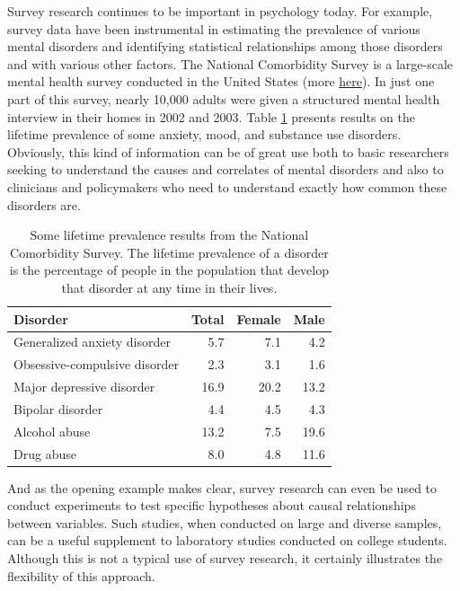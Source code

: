 \documentclass[
]{krantz}
\begin{document}
Survey research continues to be important in psychology today. For example, survey data have been instrumental in estimating the prevalence of various mental disorders and identifying statistical relationships among those disorders and with various other factors. The National Comorbidity Survey is a large-scale mental health survey conducted in the United States (more \href{https://www.hcp.med.harvard.edu/ncs/}{here}). In just one part of this survey, nearly 10,000 adults were given a structured mental health interview in their homes in 2002 and 2003. Table \ref{tab:comorbidity} presents results on the lifetime prevalence of some anxiety, mood, and substance use disorders. Obviously, this kind of information can be of great use both to basic researchers seeking to understand the causes and correlates of mental disorders and also to clinicians and policymakers who need to understand exactly how common these disorders are.

\begin{table}

\caption{\label{tab:comorbidity}Some lifetime prevalence results from the National Comorbidity Survey. The lifetime prevalence of a disorder is the percentage of people in the population that develop that disorder at any time in their lives.}
\centering
\begin{tabular}[t]{l|r|r|r}
\hline
Disorder & Total & Female & Male\\
\hline
Generalized anxiety disorder & 5.7 & 7.1 & 4.2\\
\hline
Obsessive-compulsive disorder & 2.3 & 3.1 & 1.6\\
\hline
Major depressive disorder & 16.9 & 20.2 & 13.2\\
\hline
Bipolar disorder & 4.4 & 4.5 & 4.3\\
\hline
Alcohol abuse & 13.2 & 7.5 & 19.6\\
\hline
Drug abuse & 8.0 & 4.8 & 11.6\\
\hline
\end{tabular}
\end{table}

And as the opening example makes clear, survey research can even be used to conduct experiments to test specific hypotheses about causal relationships between variables. Such studies, when conducted on large and diverse samples, can be a useful supplement to laboratory studies conducted on college students. Although this is not a typical use of survey research, it certainly illustrates the flexibility of this approach.
\end{document}
